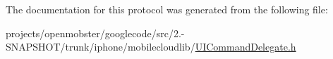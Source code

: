 \-The documentation for this protocol was generated from the following file\-:\begin{DoxyCompactItemize}
\item 
projects/openmobster/googlecode/src/2.-\/\-S\-N\-A\-P\-S\-H\-O\-T/trunk/iphone/mobilecloudlib/\hyperlink{_u_i_command_delegate_8h}{\-U\-I\-Command\-Delegate.\-h}\end{DoxyCompactItemize}
